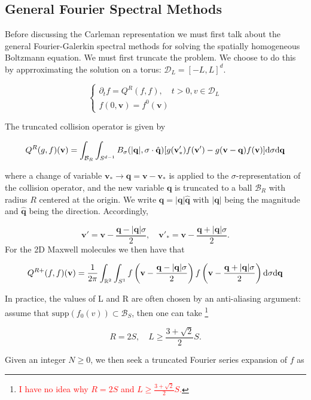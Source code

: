 \documentclass{article}
\def\t{\text}
\def\b{\mathbf}
\begin{document}
\subsection{General Fourier Spectral Methods}

Before discussing the Carleman representation we must first talk about the general Fourier-Galerkin spectral  methods for solving the spatially homogeneous Boltzmann equation. We must first truncate the problem. We choose to do this by apprroximating the solution on a torus: $\mathcal{D}_L = [-L,L]^d$.

\begin{equation} \label{eq:1}
    \begin{cases}
        \partial_t f = Q^R(f,f), \quad t > 0, v\in \mathcal{D}_L\\
        f(0, \b v) = f^0(\b v)
    \end{cases}
\end{equation}

The truncated collision operator is given by 

\[
    Q^R(g,f)(\b v) = \int_{\mathcal{B}_R} \int_{S^{d-1}} B_{\sigma}(|\b q|, \sigma \cdot \hat{\b q}) [ g(\b v'_*)f(\b v') - g(\b v-\b q)f(\b v)] \t d \sigma \t d \b q
\]

where a change of variable $\b v_* \to \b q = \b v - \b v_*$ is applied to the $\sigma$-representation of the collision operator, and the new variable $\b q$ is truncated to a ball $\mathcal{B}_R$ with radius $R$ centered at the origin. We write $\b q = |\b q|\hat{\b q}$ with $|\b q|$ being the magnitude and $\hat{\b q}$
being the direction. Accordingly,

\[
    \b v' = \b v - \frac{\b q - |\b q| \sigma}{2}, \quad \b v'_* = \b v - \frac{\b q + |\b q| \sigma}{2}.   
\]
For the 2D Maxwell molecules we then have that 

\[
    Q^{R+}(f,f)(\b v) = \frac{1}{2 \pi} \int_{\mathbb{R}^2} \int_{S^1} f \left( \b v - \frac{\b q - |\b q| \sigma}{2} \right) f \left( \b v - \frac{\b q + |\b q| \sigma}{2} \right) \t d \sigma \t d \b q
\]

In practice, the values of L and R are often chosen by an anti-aliasing argument: assume that $\text{supp}(f_0(v)) \subset \mathcal{B}_S$, then one can take \footnote{\textcolor{red}{I have no idea why $ R = 2S$ and $L \geq \frac{3 + \sqrt{2}}{2} S$.}}

\[
    R = 2S, \quad L \geq \frac{3 + \sqrt{2}}{2} S.
\]

 Given an integer $N \geq 0$, we then seek a truncated Fourier series expansion of $f$ as
\end{document}
